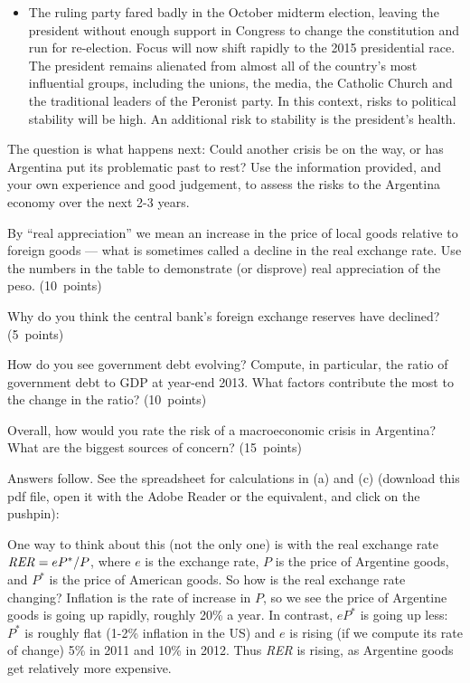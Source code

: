\documentclass[letterpaper,12pt]{exam}
\begin{document}
\begin{questions}
\begin{itemize}
\item The ruling party fared badly in the October midterm election,
 leaving the president without enough support in Congress
 to change the constitution and run for re-election.
 Focus will now shift rapidly to the 2015 presidential race.
 The president remains alienated from almost all of the country's most influential groups,
including the unions, the media, the Catholic Church and the traditional
leaders of the Peronist party. In this context, risks to political stability will be
high. An additional risk to stability is the president's health.
\end{itemize}
%
The question is what happens next:  Could another crisis be on the way,
or has Argentina put its problematic past to rest?
Use the information provided, and your own experience and good judgement,
to assess the risks to the Argentina economy over the next 2-3 years.
%
\begin{parts}
\item By ``real appreciation'' we mean an increase in the price
of local goods relative to foreign goods ---
what is sometimes called a decline in the real exchange rate.
Use the numbers in the table to demonstrate (or disprove) real appreciation
of the peso.
(10~points)

\item Why do you think the central bank's foreign exchange reserves have declined?
(5~points)

\item How do you see government debt evolving?
Compute, in particular, the ratio of government debt to GDP at year-end 2013.
What factors contribute the most to the change in the ratio?
(10~points)

\item Overall, how would you rate the risk of a macroeconomic crisis in Argentina?
What are the biggest sources of concern?
(15~points)
\end{parts}

\begin{solution}
Answers follow.
See the spreadsheet for calculations in (a) and (c)
(download this pdf file, open it with the Adobe Reader or the equivalent,
and click on the pushpin):

\begin{parts}
\item
One way to think about this (not the only one) is with the real exchange rate
$ \mbox{\em RER\/} = eP^*/P$, where $e$ is the exchange rate, $P$ is the price of Argentine goods,
and $P^*$ is the price of American goods.
So how is the real exchange rate changing?
Inflation is the rate of increase in $P$, so we see the price of Argentine goods
is going up rapidly, roughly 20\% a year.
In contrast, $eP^*$ is going up less:
$P^*$ is roughly flat (1-2\% inflation in the US)
and $e$ is rising (if we compute its rate of change)
5\% in 2011 and 10\% in 2012.
Thus {\it RER\/} is rising, as Argentine goods get relatively more expensive.


\end{parts}
\end{solution}
\end{questions}
\end{document}
